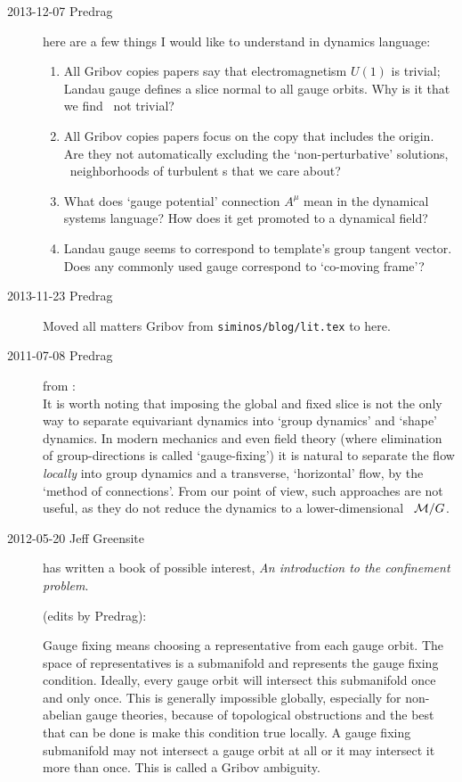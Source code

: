 \begin{description}
\item[2013-12-07  Predrag]
here are a few things I would like to understand in dynamics language:
\begin{enumerate}
  \item All Gribov copies papers say that electromagnetism $U(1)$ is trivial;
  Landau gauge defines a slice normal to all gauge orbits. Why is it that we find
  \ not trivial?
  \item All Gribov copies papers focus on the copy that includes the
  origin. Are they not automatically excluding the `non-perturbative' solutions,
  \ie\ neighborhoods of turbulent \rpo s that we care about?
  \item What does `gauge potential' connection $A^\mu$ mean in the dynamical
  systems language? How does it get promoted to a dynamical field?
  \item Landau gauge seems to correspond to template's group tangent vector.
  Does any commonly used gauge correspond to `co-moving frame'?
\end{enumerate}


\item[2013-11-23  Predrag] Moved all matters Gribov from
\texttt{siminos/blog/lit.tex} to here.

\item[2011-07-08 Predrag] from :                     \toCB
\\
It is worth noting that imposing the global and fixed slice
is not the only way to separate equivariant dynamics into `group
dynamics' and `shape' dynamics. In modern mechanics and even
field theory (where elimination of group-directions is called
`gauge-fixing') it is natural to separate the flow {\em locally} into
group dynamics and a transverse, `horizontal'
flow, by the `method of
connections'. From our point of view, such
approaches are not useful, as they do not reduce the dynamics to a
lower-dimensional \reducedsp\ ${\cal M}/G$.


\item[2012-05-20 Jeff Greensite] has written a book of
possible interest, \emph{An introduction to the confinement problem}.

(edits by Predrag):

Gauge fixing means choosing a representative from each gauge orbit. The
space of representatives is a submanifold and represents the gauge fixing
condition. Ideally, every gauge orbit will intersect this submanifold
once and only once. This is generally impossible globally, especially for
non-abelian gauge theories, because of topological obstructions and the
best that can be done is make this condition true locally. A gauge fixing
submanifold may not intersect a gauge orbit at all or it may intersect it
more than once. This is called a Gribov ambiguity.


\end{description}
